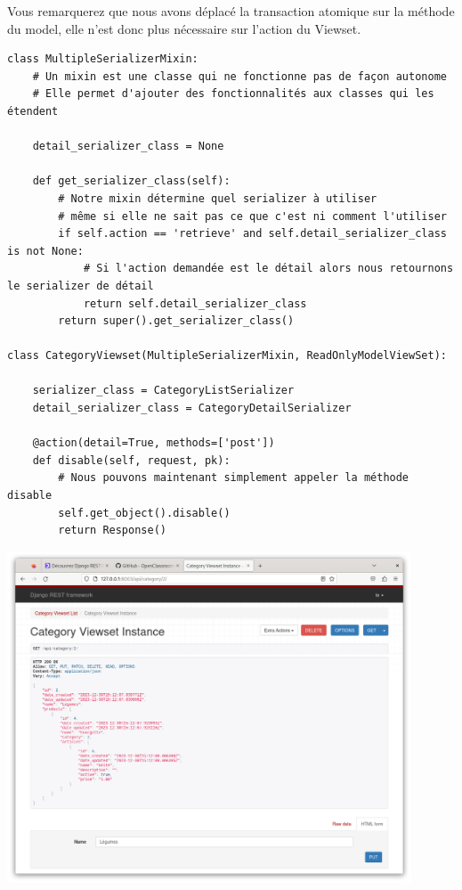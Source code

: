 \documentclass[a4paper]{article}
\begin{document}
\begin{theorem}
Vous remarquerez que nous avons déplacé la transaction atomique sur la méthode du model, elle n’est donc plus nécessaire sur l’action du Viewset.
\end{theorem}
\begin{verbatim}
class MultipleSerializerMixin:
    # Un mixin est une classe qui ne fonctionne pas de façon autonome
    # Elle permet d'ajouter des fonctionnalités aux classes qui les étendent

    detail_serializer_class = None

    def get_serializer_class(self):
        # Notre mixin détermine quel serializer à utiliser
        # même si elle ne sait pas ce que c'est ni comment l'utiliser
        if self.action == 'retrieve' and self.detail_serializer_class is not None:
            # Si l'action demandée est le détail alors nous retournons le serializer de détail
            return self.detail_serializer_class
        return super().get_serializer_class()

class CategoryViewset(MultipleSerializerMixin, ReadOnlyModelViewSet):
 
    serializer_class = CategoryListSerializer
    detail_serializer_class = CategoryDetailSerializer
 
    @action(detail=True, methods=['post'])
    def disable(self, request, pk):
        # Nous pouvons maintenant simplement appeler la méthode disable
        self.get_object().disable()
        return Response()
\end{verbatim}
\begin{center}
\includegraphics[width=12cm]{images/image19.png}
\end{center}
\end{document}
